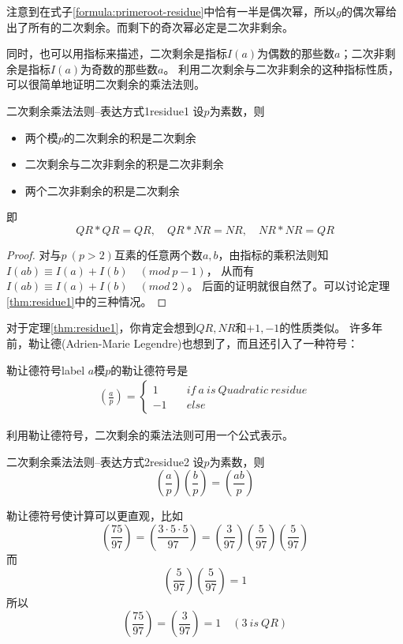 注意到在式子\ref{formula:primeroot-residue}中恰有一半是偶次幂，所以{\heiti $g$的偶次幂给出了所有的二次剩余}。而剩下的奇次幂必定是二次非剩余。

同时，也可以用指标来描述，二次剩余是指标$I(a)$为偶数的那些数$a$；二次非剩余是指标$I(a)$为奇数的那些数$a$。
利用二次剩余与二次非剩余的这种指标性质，可以很简单地证明二次剩余的乘法法则。

\begin{theorem}{二次剩余乘法法则--表达方式1}{residue1}
设$p$为素数，则
\begin{itemize}
\item 两个模$p$的二次剩余的积是二次剩余
\item 二次剩余与二次非剩余的积是二次非剩余
\item 两个二次非剩余的积是二次剩余
\end{itemize}
即
$$
QR*QR=QR  ,\quad QR*NR=NR  ,\quad NR*NR=QR
$$
\end{theorem}

\begin{proof}
对与$p\ (p>2)$互素的任意两个数$a,b$，由指标的乘积法则知$I(ab)\equiv I(a)+I(b) \quad (mod \ p-1)$，
从而有$I(ab)\equiv I(a)+I(b) \quad (mod \ 2)$。 后面的证明就很自然了。可以讨论定理\ref{thm:residue1}中的三种情况。
\end{proof}

\vbox{}

对于定理\ref{thm:residue1}，你肯定会想到$QR,NR$和$+1,-1$的性质类似。
许多年前，勒让德(Adrien-Marie Legendre)也想到了，而且还引入了一种符号：


\begin{definition}{勒让德符号}{label}
$a$模$p$的勒让德符号是
\begin{align*}
\left(\frac{a}{p}\right)=\left\{\begin{matrix}
1 & \quad  if\ a\ is\ Quadratic\ residue \\  
-1& \quad  else
\end{matrix}\right.
\end{align*}
\end{definition}

利用勒让德符号，二次剩余的乘法法则可用一个公式表示。

\begin{theorem}{二次剩余乘法法则--表达方式2}{residue2}
设$p$为素数，则
$$
\left(\frac{a}{p}\right)\left(\frac{b}{p}\right)=\left(\frac{ab}{p}\right)
$$
\end{theorem}

勒让德符号使计算可以更直观，比如
$$
\left(\frac{75}{97}\right)=\left(\frac{3\cdot5\cdot5}{97}\right)=\left(\frac{3}{97}\right)\left(\frac{5}{97}\right)\left(\frac{5}{97}\right)
$$
而
$$
\left(\frac{5}{97}\right)\left(\frac{5}{97}\right)=1
$$
所以
$$
\left(\frac{75}{97}\right)=\left(\frac{3}{97}\right)=1 \quad   (3\ is\ QR)
$$


